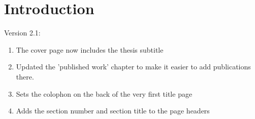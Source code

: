 \chapter{Introduction}

Version 2.1: 

\begin{enumerate}
	\item The cover page now includes the thesis subtitle
	\item Updated the 'published work' chapter to make it easier to add publications there.
	\item Sets the colophon on the back of the very first title page
	\item Adds the section number and section title to the page headers 
\end{enumerate}

